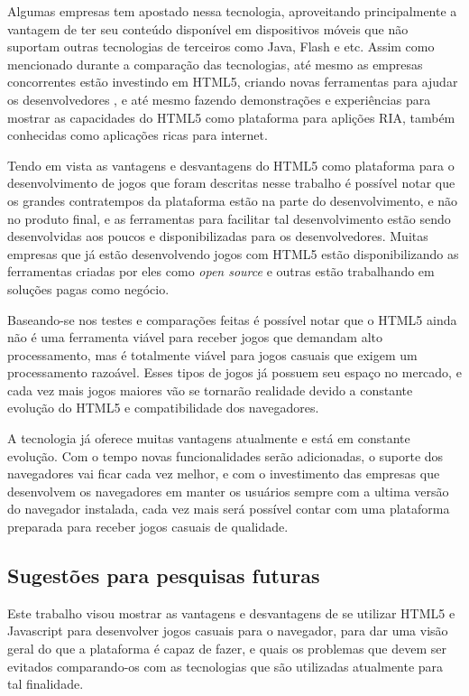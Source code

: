 Algumas empresas tem apostado nessa tecnologia, aproveitando
principalmente a vantagem de ter seu conteúdo disponível em
dispositivos móveis que não suportam outras tecnologias de terceiros
como Java, Flash e etc. Assim como mencionado durante a comparação das
tecnologias, até mesmo as empresas concorrentes estão investindo em
HTML5, criando novas ferramentas para ajudar
os desenvolvedores \cite{website:adobeedge}, e até mesmo fazendo
demonstrações e experiências para mostrar as capacidades do HTML5 como
plataforma para aplições RIA, também conhecidas como aplicações ricas
para internet.

Tendo em vista as vantagens e desvantagens do HTML5 como plataforma
para o desenvolvimento de jogos que foram descritas nesse trabalho é possível notar que os grandes
contratempos da plataforma estão na parte do desenvolvimento, e não no
produto final, e as ferramentas para facilitar tal desenvolvimento
estão sendo desenvolvidas aos poucos e disponibilizadas para os
desenvolvedores. Muitas empresas que já estão desenvolvendo jogos com HTML5
estão disponibilizando as ferramentas criadas por eles como
\textit{open source} e outras estão trabalhando em soluções pagas como negócio.

Baseando-se nos testes e comparações feitas é possível notar que o
HTML5 ainda não é uma ferramenta viável para receber jogos que
demandam alto processamento, mas é totalmente viável para jogos
casuais que exigem um processamento razoável. Esses tipos de jogos já possuem seu espaço no
mercado, e cada vez mais jogos maiores vão se tornarão realidade devido a constante evolução
do HTML5 e compatibilidade dos navegadores.

A tecnologia já oferece muitas vantagens atualmente e está em
constante evolução. Com o tempo novas funcionalidades serão
adicionadas, o suporte dos navegadores vai ficar cada vez melhor, e
com o investimento das empresas que desenvolvem os navegadores em manter
os usuários sempre com a ultima versão do navegador instalada, cada vez
mais será possível contar com uma plataforma preparada para receber
jogos casuais de qualidade.

\subsection{Sugestões para pesquisas futuras}

Este trabalho visou mostrar as vantagens e desvantagens de se utilizar
HTML5 e Javascript para desenvolver jogos casuais para o navegador,
para dar uma visão geral do que a plataforma é capaz de fazer, e quais
os problemas que devem ser evitados comparando-os com as tecnologias
que são utilizadas atualmente para tal finalidade.

